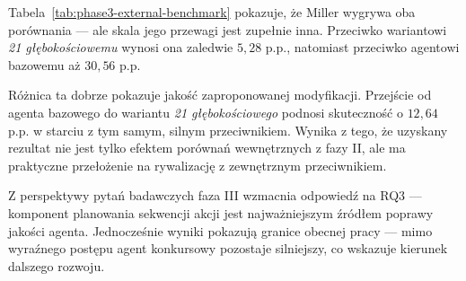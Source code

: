 Tabela~\ref{tab:phase3-external-benchmark} pokazuje, że Miller wygrywa oba porównania --- ale skala jego przewagi jest zupełnie inna. Przeciwko wariantowi \textit{21 głębokościowemu} wynosi ona zaledwie \(5{,}28\) p.p., natomiast przeciwko agentowi bazowemu aż \(30{,}56\) p.p.

Różnica ta dobrze pokazuje jakość zaproponowanej modyfikacji. Przejście od agenta bazowego do wariantu \textit{21 głębokościowego} podnosi skuteczność o \(12{,}64\) p.p. w starciu z tym samym, silnym przeciwnikiem. Wynika z tego, że uzyskany rezultat nie jest tylko efektem porównań wewnętrznych z fazy II, ale ma praktyczne przełożenie na rywalizację z zewnętrznym przeciwnikiem.

Z perspektywy pytań badawczych faza III wzmacnia odpowiedź na RQ3 --- komponent planowania sekwencji akcji jest najważniejszym źródłem poprawy jakości agenta. Jednocześnie wyniki pokazują granice obecnej pracy --- mimo wyraźnego postępu agent konkursowy pozostaje silniejszy, co wskazuje kierunek dalszego rozwoju.
